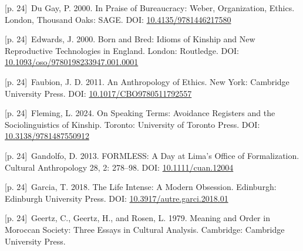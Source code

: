 \documentclass[10pt,a4paper]{article}
\begin{document}
\noindent\begin{minipage}[t]{\linewidth}{\scriptsize\color{gray} [p. 24]}\ Du Gay, P. 2000. In Praise of Bureaucracy: Weber, Organization, Ethics. London, Thousand Oaks: SAGE. DOI: \url{10.4135/9781446217580}\par\end{minipage}\par
\noindent\begin{minipage}[t]{\linewidth}{\scriptsize\color{gray} [p. 24]}\ Edwards, J. 2000. Born and Bred: Idioms of Kinship and New Reproductive Technologies in England. London: Routledge. DOI: \url{10.1093/oso/9780198233947.001.0001}\par\end{minipage}\par
\noindent\begin{minipage}[t]{\linewidth}{\scriptsize\color{gray} [p. 24]}\ Faubion, J. D. 2011. An Anthropology of Ethics. New York: Cambridge University Press. DOI: \url{10.1017/CBO9780511792557}\par\end{minipage}\par
\noindent\begin{minipage}[t]{\linewidth}{\scriptsize\color{gray} [p. 24]}\ Fleming, L. 2024. On Speaking Terms: Avoidance Registers and the Sociolinguistics of Kinship. Toronto: University of Toronto Press. DOI: \url{10.3138/9781487550912}\par\end{minipage}\par
\noindent\begin{minipage}[t]{\linewidth}{\scriptsize\color{gray} [p. 24]}\ Gandolfo, D. 2013. FORMLESS: A Day at Lima’s Office of Formalization. Cultural Anthropology 28, 2: 278–98. DOI: \url{10.1111/cuan.12004}\par\end{minipage}\par
\noindent\begin{minipage}[t]{\linewidth}{\scriptsize\color{gray} [p. 24]}\ Garcia, T. 2018. The Life Intense: A Modern Obsession. Edinburgh: Edinburgh University Press. DOI: \url{10.3917/autre.garci.2018.01}\par\end{minipage}\par
\noindent\begin{minipage}[t]{\linewidth}{\scriptsize\color{gray} [p. 24]}\ Geertz, C., Geertz, H., and Rosen, L. 1979. Meaning and Order in Moroccan Society: Three Essays in Cultural Analysis. Cambridge: Cambridge University Press.\par\end{minipage}\par
\end{document}
